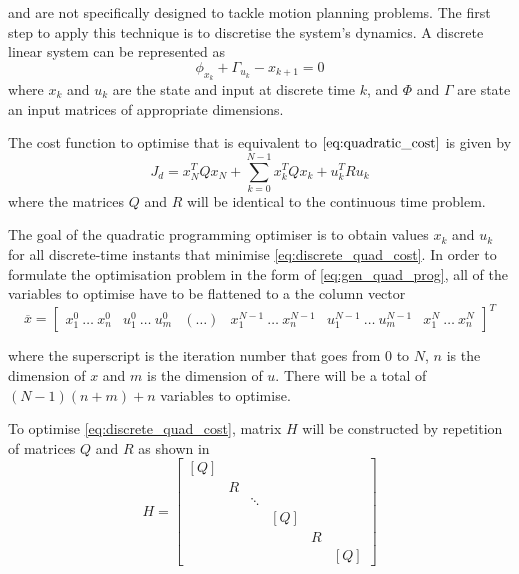 and are not specifically designed to tackle motion planning problems. 
The first step to apply this technique is to discretise the system's dynamics. A discrete linear system can be represented as
\begin{equation}
    \label{eq:discrete_state_space} 
    \phi_{x_k} + \Gamma_{u_k} - x_{k+1} = 0
\end{equation}
where $x_k$ and $u_k$ are the state and input at discrete time $k$, and $\Phi$ and $\Gamma$ are state an input matrices of appropriate dimensions.
\par The cost function to optimise that is equivalent to $\ref{eq:quadratic_cost}$ is given by
\begin{equation}
    J_d = x_N^T Q x_N + \sum_{k=0}^{N-1} x_k^T Q x_k + u_k^T R u_k
    \label{eq:discrete_quad_cost}
\end{equation}
where the matrices $Q$ and $R$ will be identical to the continuous time problem.

\par The goal of the quadratic programming optimiser is to obtain values $x_k$ and $u_k$ for all discrete-time instants that minimise \ref{eq:discrete_quad_cost}. In order to formulate the optimisation problem in the form of \ref{eq:gen_quad_prog}, all of the variables to optimise have to be flattened to a the column vector \begin{equation}
    \label{eq:quad_prog_xbar}
    \overline{x} = \begin{bmatrix} x^0_1\ \dots \ x^0_n & u_1^0\ \dots\ u_m^0 & (\dots) & x_1^{N-1}\ \dots\ x_n^{N-1} & u_1^{N-1}\ \dots\ u_m^{N-1} &  x_1^N\ \dots\ x_n^N \end{bmatrix} ^T
\end{equation}

where the superscript is the iteration number that goes from 0 to $N$, $n$ is the dimension of $x$ and $m$ is the dimension of $u$. There will be a total of $(N-1)(n+m)+n$ variables to optimise.
\par To optimise \ref{eq:discrete_quad_cost}, matrix $H$ will be constructed by repetition of matrices $Q$ and $R$ as shown in 
\begin{equation}
    \label{eq:quad_prog_h}
    H = \begin{bmatrix}
        [Q] & & & & & \\
        & R & & & &  \\
        & & \ddots & & & \\
        & & & [Q] & & \\
        & & & & R & \\
        & & & & & [Q]
    \end{bmatrix}
\end{equation}

